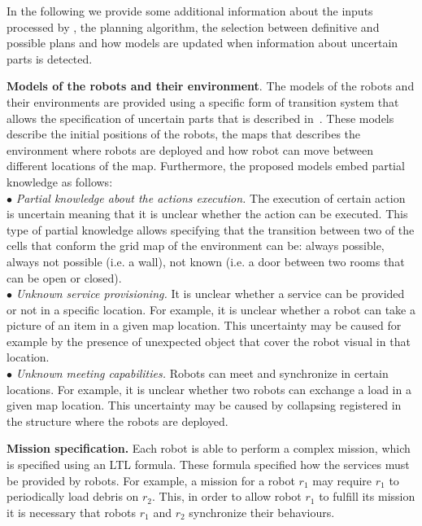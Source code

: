 In the following we provide some additional information about the inputs processed  by \toolName, the planning algorithm, the selection between definitive and possible plans and how models are updated when information about uncertain parts is detected.




\textbf{Models of the robots and their environment}. 
The models of the robots and their environments are provided using a specific form of transition system that allows the specification of uncertain parts that is described  in~\cite{mapmaker17}.
These models describe the initial positions of the robots, the maps that describes the environment where robots are deployed and how robot can move between different locations of the map. 
Furthermore, the proposed models embed partial knowledge as follows:\\
$\bullet$  \emph{Partial knowledge about the actions execution.} 
The execution of certain action is uncertain meaning that it is unclear whether the action can be executed.
This type of partial knowledge allows specifying that the transition between two of the cells that conform the grid map of the environment can be:
always possible, always not possible (i.e. a wall), not known (i.e. a door between two rooms that can be open or closed).\\
$\bullet$ \emph{Unknown service provisioning.} 
It is unclear  whether a service can be provided or not in a specific location. 
For example, it is unclear whether a robot can take a picture of an item in a given map location.
This  uncertainty may be caused for example by the presence of unexpected object that cover the robot visual in that location.\\
$\bullet$ \emph{Unknown meeting capabilities.} Robots can meet and synchronize in certain locations.
For example, it is unclear whether two robots can exchange a load in a given map location.
This uncertainty may be caused by collapsing registered in the structure where the robots are deployed.







\textbf{Mission specification.}
Each robot is able to perform a complex mission, which is specified using an LTL formula.
These formula specified how the services must be provided by robots.
For example, a mission for a robot $r_1$ may require $r_1$ to  periodically load debris on $r_2$.
This, in order to allow robot $r_1$ to fulfill its mission it is necessary that robots $r_1$ and $r_2$ synchronize their behaviours.





